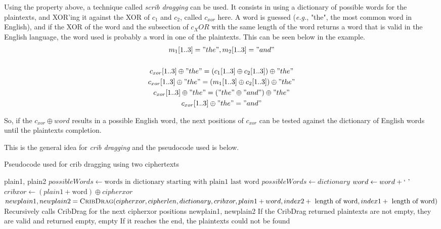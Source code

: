 \documentclass[a4paper,11pt]{article}
\begin{document}
Using the property above, a technique called \textit{scrib dragging} can be used.
It consists in using a dictionary of possible words for the plaintexts, and XOR'ing it
against the XOR of $c_1$ and $c_2$, called $c_{xor}$ here. A word is guessed
(\textit{e.g.}, "the", the most common word in English), and if the XOR of the word
and the subsection of $c_XOR$ with the same length of the word returns a word that
is valid in the English language, the word used is probably a word in one of the
plaintexts. This can be seen below in the example.
\begin{gather*}
	m_1[1..3] = "the", m_2[1..3] = "and" \\ \\
	c_{xor}[1..3] \oplus "the" = (c_1[1..3] \oplus c_2[1..3]) \oplus "the" \\
	c_{xor}[1..3] \oplus "the" = (m_1[1..3] \oplus c_2[1..3]) \oplus "the" \\
	c_{xor}[1..3] \oplus "the" = ("the" \oplus "and") \oplus "the" \\
	c_{xor}[1..3] \oplus "the" = "and"
\end{gather*}

So, if the $c_{xor} \oplus word$ results in a possible English word, the next positions
of $c_{xor}$ can be tested against the dictionary of English words until the plaintexts
completion.

This is the general idea for \textit{crib dragging} and the pseudocode used is below.

\pagebreak

\begin{algorithm}
\caption{Pseudocode used for crib dragging using two ciphertexts}\label{cribdrag}
\begin{algorithmic}[1]
	\Return plain1, plain2
\EndIf
{}
	\State $possibleWords \gets \text{words in dictionary starting with plain1 last word}$
\Else
	\State $possibleWords \gets dictionary$
\EndIf
{}
	\State $word \gets word + \text{\lq}\text{ }\text{\rq}$
	\State $cribxor \gets (plain1 + \text{word}) \oplus cipherxor$
		\State $newplain1, newplain2 = \Call{CribDrag}{cipherxor, cipherlen, dictionary,
			cribxor, plain1 + word, index2 + \text{ length of word}, index1 + \text{ length of word}}$
		\Comment Recursively calls CribDrag for the next cipherxor positions
			\State \Return newplain1, newplain2
			\Comment If the CribDrag returned plaintexts are not empty, they are valid and returned
		\EndIf
	\EndIf
\EndFor
\State \Return empty, empty
\Comment If it reaches the end, the plaintexts could not be found
\EndProcedure
\end{algorithmic}
\end{algorithm}
\end{document}
